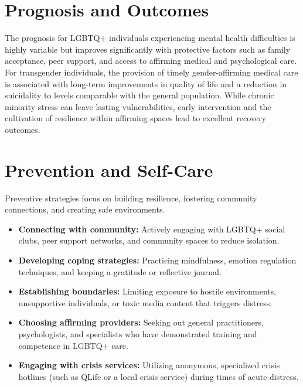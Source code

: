 \section*{Prognosis and Outcomes}
The prognosis for LGBTQ+ individuals experiencing mental health difficulties is highly variable but improves significantly with protective factors such as family acceptance, peer support, and access to affirming medical and psychological care. For transgender individuals, the provision of timely gender-affirming medical care is associated with long-term improvements in quality of life and a reduction in suicidality to levels comparable with the general population. While chronic minority stress can leave lasting vulnerabilities, early intervention and the cultivation of resilience within affirming spaces lead to excellent recovery outcomes.

\section*{Prevention and Self-Care}
Preventive strategies focus on building resilience, fostering community connections, and creating safe environments.
\begin{itemize}
    \item \textbf{Connecting with community:} Actively engaging with LGBTQ+ social clubs, peer support networks, and community spaces to reduce isolation.
    \item \textbf{Developing coping strategies:} Practicing mindfulness, emotion regulation techniques, and keeping a gratitude or reflective journal.
    \item \textbf{Establishing boundaries:} Limiting exposure to hostile environments, unsupportive individuals, or toxic media content that triggers distress.
    \item \textbf{Choosing affirming providers:} Seeking out general practitioners, psychologists, and specialists who have demonstrated training and competence in LGBTQ+ care.
    \item \textbf{Engaging with crisis services:} Utilizing anonymous, specialized crisis hotlines (such as QLife or a local crisis service) during times of acute distress.
\end{itemize}

